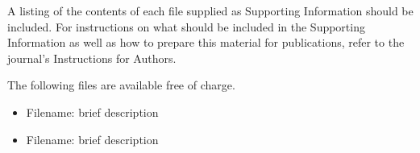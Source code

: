 \documentclass[journal=jctcce,manuscript=article]{achemso}
\begin{document}
\begin{suppinfo}

A listing of the contents of each file supplied as Supporting Information
should be included. For instructions on what should be included in the
Supporting Information as well as how to prepare this material for
publications, refer to the journal's Instructions for Authors.

The following files are available free of charge.
\begin{itemize}
  \item Filename: brief description
  \item Filename: brief description
\end{itemize}

\end{suppinfo}


\end{document}
